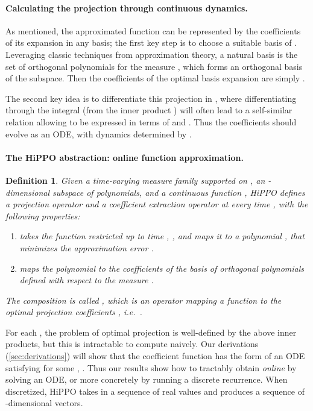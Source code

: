 \documentclass{article}
\newtheorem{definition}{Definition}
\begin{document}
\paragraph{Calculating the projection through continuous dynamics.}
As mentioned, the approximated function can be represented by the  coefficients of its expansion in any basis;
the first key step is to choose a suitable basis  of .
Leveraging classic techniques from approximation theory, a natural basis is the set of orthogonal polynomials for the measure ,
which forms an orthogonal basis of the subspace.
Then the coefficients of the optimal basis expansion are simply .

The second key idea is to differentiate this projection in , where
differentiating through the integral (from the inner product
) will often lead to a self-similar relation
allowing  to be expressed in terms of  and .
Thus the coefficients  should evolve as an ODE, with dynamics determined by .

\paragraph{The HiPPO abstraction: online function approximation.}
\begin{definition}\label{def:hippo}
    Given a time-varying measure family  supported on , an
    -dimensional subspace  of polynomials, and a continuous
    function ,
    HiPPO defines a \emph{projection} operator  and a \emph{coefficient extraction} operator  at every time , with the following properties:
    \begin{enumerate}[label=(\arabic*), topsep=0em, partopsep=0.0em, itemsep=0em, parsep=0.1em, leftmargin=2em]
      \item  takes the function  restricted up to time ,
      , and maps it to a
      polynomial , that minimizes the approximation error .
        \item  maps the polynomial 
        to the coefficients  of the basis of orthogonal
        polynomials defined with respect to the measure .
    \end{enumerate}
    The composition  is called , which is an operator
    mapping a function  to the optimal projection coefficients
    , i.e.\ .
\end{definition}

For each , the problem of optimal projection
 is well-defined by the above inner products,
but this is intractable to compute naively.
Our derivations (\cref{sec:derivations}) will show that
the coefficient function  has the form of an ODE
satisfying  for some , .
Thus our results show how to tractably obtain  \emph{online} by solving an
ODE, or more concretely by running a discrete recurrence.
When discretized, HiPPO takes in a sequence of real values and produces a
sequence of -dimensional vectors.
\end{document}
